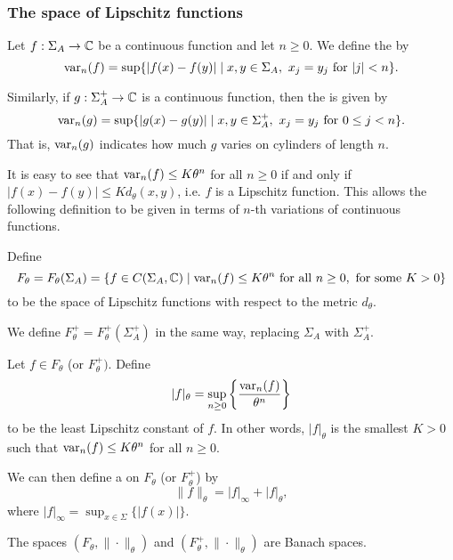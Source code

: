 \subsubsection{The space of Lipschitz functions}
\begin{definition}
	Let $f : \Sigma_A \to \mathbb{C}$ be a continuous function and let $n \geq 0$. We define the  by
	\[
		\operatorname{var}_n(f) = \sup\{|f(x) - f(y)| \mid x, y \in \Sigma_A,\ x_j = y_j \text{ for } |j| < n\}.
	\]
	
	Similarly, if $g : \Sigma_A^+ \to \mathbb{C}$ is a continuous function, then the  is given by
	\[
	\operatorname{var}_n(g) = \sup\{|g(x) - g(y)| \mid x, y \in \Sigma_A^+,\ x_j = y_j \text{ for } 0 \leq j < n\}.
	\]
	That is, $\operatorname{var}_n(g)$ indicates how much $g$ varies on cylinders of length $n$.~\cite[Lecture 8]{magic-ergodic}
\end{definition}

It is easy to see that $\operatorname{var}_n(f) \leq K\theta^n$ for all $n \geq 0$ if and only if $|f(x) - f(y)| \leq Kd_\theta(x, y)$, i.e. $f$ is a Lipschitz function. This allows the following definition to be given in terms of $n$-th variations of continuous functions.

\begin{definition}
	Define
	\[
		F_\theta = F_\theta(\Sigma_A) = \{f \in C(\Sigma_A, \mathbb{C}) \mid \operatorname{var}_n(f) \leq K\theta^n \text{ for all } n \geq 0, \text{ for some } K > 0\}
	\]
	to be the space of Lipschitz functions with respect to the metric $d_\theta$.
	
	We define $F_\theta^+ = F_\theta^+(\Sigma_A^+)$ in the same way, replacing $\Sigma_A$ with $\Sigma_A^+$.
\end{definition}

\begin{definition}
	Let $f \in F_\theta$ (or $F_\theta^+)$. Define
	\[
		|f|_\theta = \sup_{n \geq 0}\left\{\frac{\operatorname{var}_n(f)}{\theta^n}\right\}
	\]
	to be the least Lipschitz constant of $f$. In other words, $|f|_\theta$ is the smallest $K > 0$ such that $\operatorname{var}_n(f) \leq K\theta^n$ for all $n \geq 0$.
	
	We can then define a  on $F_\theta$ (or $F_\theta^+$) by
	\[
		\|f\|_\theta = |f|_\infty+ |f|_\theta,
	\]
	where $|f|_\infty = \sup_{x \in \Sigma}\{|f(x)|\}$.
\end{definition}

\begin{proposition}
	The spaces $(F_\theta, \|\cdot\|_\theta)$ and $(F_\theta^+, \|\cdot\|_\theta)$ are Banach spaces.
\end{proposition}

